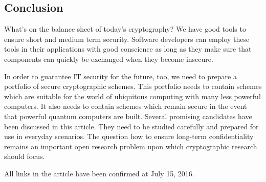 \begin{bibunit}[babalpha]
\section{Conclusion}
\label{sec:conclusion}

What's on the balance sheet of today's cryptography?  We
have good tools to ensure short and medium term
security.  Software developers can employ these
tools in their applications with good conscience
as long as they make sure that components
can quickly be exchanged when they become
insecure.

In order to guarantee IT security for the future, too,
we need to prepare a portfolio of secure cryptographic
schemes.  This portfolio needs to contain schemes
which are suitable for the world of ubiquitous
computing with many less powerful computers.  It
also needs to contain schemes which remain secure
in the event that powerful quantum computers are
built.  Several promising candidates have been
discussed in this article.  They need to be
studied carefully and prepared for use in everyday
scenarios.  The question how to ensure long-term
confidentiality remains an important open research
problem upon which cryptographic research should
focus.


\putbib[../de/references]
\end{bibunit}

\noindent All links in the article have been confirmed at July 15, 2016.


